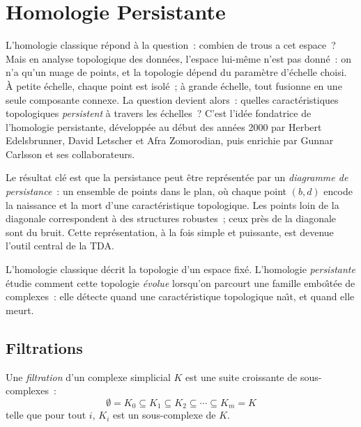 \chapter{Homologie Persistante}
\label{ch:persistante}

L'homologie classique r\'epond \`a la question~: \og combien de trous a cet espace~? \fg Mais en analyse topologique des donn\'ees, l'espace lui-m\^eme n'est pas donn\'e~: on n'a qu'un nuage de points, et la topologie d\'epend du param\`etre d'\'echelle choisi. \`A petite \'echelle, chaque point est isol\'e~; \`a grande \'echelle, tout fusionne en une seule composante connexe. La question devient alors~: \og quelles caract\'eristiques topologiques \emph{persistent} \`a travers les \'echelles~? \fg C'est l'id\'ee fondatrice de l'homologie persistante, d\'evelopp\'ee au d\'ebut des ann\'ees 2000 par Herbert Edelsbrunner, David Letscher et Afra Zomorodian, puis enrichie par Gunnar Carlsson et ses collaborateurs.

Le r\'esultat cl\'e est que la persistance peut \^etre repr\'esent\'ee par un \emph{diagramme de persistance}~: un ensemble de points dans le plan, o\`u chaque point $(b, d)$ encode la naissance et la mort d'une caract\'eristique topologique. Les points loin de la diagonale correspondent \`a des structures robustes~; ceux pr\`es de la diagonale sont du bruit. Cette repr\'esentation, \`a la fois simple et puissante, est devenue l'outil central de la TDA.

\begin{intuition}
L'homologie classique d\'ecrit la topologie d'un espace fix\'e.
L'homologie \emph{persistante} \'etudie comment cette topologie
\emph{\'evolue} lorsqu'on parcourt une famille embo\^{\i}t\'ee de
complexes~: elle d\'etecte quand une caract\'eristique topologique
na\^{\i}t, et quand elle meurt.
\end{intuition}

\section{Filtrations}

\begin{definition}
Une \emph{filtration} d'un complexe simplicial $K$ est une suite
croissante de sous-complexes~:
\[
  \emptyset = K_0 \subseteq K_1 \subseteq K_2 \subseteq \cdots
  \subseteq K_m = K
\]
telle que pour tout $i$, $K_i$ est un sous-complexe de $K$.
\end{definition}

